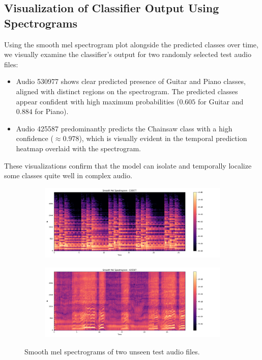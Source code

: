 \documentclass{article}
\begin{document}
\subsection{Visualization of Classifier Output Using Spectrograms}
Using the smooth mel spectrogram plot alongside the predicted classes over time, we visually examine the classifier’s output for two randomly selected test audio files:
\begin{itemize}
    \item Audio 530977 shows clear predicted presence of Guitar and Piano classes, aligned with distinct regions on the spectrogram. The predicted classes appear confident with high maximum probabilities ($0.605$ for Guitar and $0.884$ for Piano).
    \item Audio 425587 predominantly predicts the Chainsaw class with a high confidence ($\approx0.978$), which is visually evident in the temporal prediction heatmap overlaid with the spectrogram.
\end{itemize}

These visualizations confirm that the model can isolate and temporally localize some classes quite well in complex audio.

\begin{figure}[ht]
    \centering
    \small
    \begin{subfigure}[b]{0.48\textwidth}
        \centering
        \includegraphics[width=\textwidth]{figures/530977_plot.png}
        \label{fig:task7_1}
    \end{subfigure}
    \hfill
    \begin{subfigure}[b]{0.48\textwidth}
        \centering
        \includegraphics[width=\textwidth]{figures/425587_plot.png}
        \label{fig:task7_1_2}
    \end{subfigure}
    \hfill
    \caption{Smooth mel spectrograms of two unseen test audio files.}
    \label{fig:Task7_A}
\end{figure}
\end{document}
